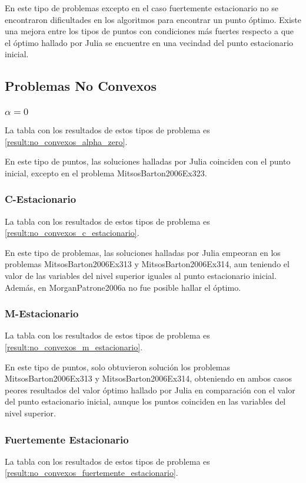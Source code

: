 En este tipo de problemas excepto en el caso fuertemente estacionario no se encontraron dificultades en los algoritmos para encontrar un punto óptimo. Existe una mejora entre los tipos de puntos con condiciones más fuertes respecto a que el óptimo hallado por Julia se encuentre en una vecindad del punto estacionario inicial. 

\subsection{Problemas No Convexos}


\subsubsection{$\alpha =0$}
La tabla con los resultados de estos tipos de problema es \ref{result:no_convexos_alpha_zero}.

 En este tipo de puntos, las soluciones halladas por Julia coinciden con el punto inicial, excepto en el problema MitsosBarton2006Ex323.
    
\subsubsection{C-Estacionario}
La tabla con los resultados de estos tipos de problema es \ref{result:no_convexos_c_estacionario}.

 En este tipo de problemas, las soluciones halladas por Julia empeoran en los problemas MitsosBarton2006Ex313 y MitsosBarton2006Ex314, aun teniendo el valor de las variables del nivel superior iguales al punto estacionario inicial. Además, en MorganPatrone2006a no fue posible hallar el óptimo.
\subsubsection{M-Estacionario}
La tabla con los resultados de estos tipos de problema es \ref{result:no_convexos_m_estacionario}.  

 En este tipo de puntos, solo obtuvieron solución los problemas MitsosBarton2006Ex313 y MitsosBarton2006Ex314, obteniendo en ambos casos peores resultados del valor óptimo hallado por Julia en comparación con el valor del punto estacionario inicial, aunque los puntos coinciden en las variables del nivel superior.
    
\subsubsection{Fuertemente Estacionario}
La tabla con los resultados de estos tipos de problema es \ref{result:no_convexos_fuertemente_estacionario}.

